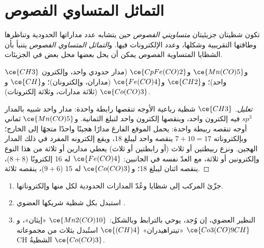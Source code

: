 \section{التماثل المتساوي الفصوص}

\begin{definition}\label{def:b3:organometallic-bonding:isolobal}
تكون شظيتان جزيئيتان \emph{متساويتي الفصوص} حين يتشابه
عدد مداراتها الحدودية وتناظرها وطاقتها التقريبية وشكلها، 
وعدد الإلكترونات فيها. و\emph{التماثل المتساوي
الفصوص} يتنبأ بأن الشظايا المتساوية الفصوص يمكن أن يحل بعضها
محل بعض في الجزيئات.
\end{definition}

\begin{proposition}\label{prop:b3:organometallic-bonding:isolobal}
$\ce{CH3}$ و$\ce{Mn(CO)5}$ و$\ce{CpFe(CO)2}$  (مدار حدودي واحد، وإلكترون واحد)؛
و$\ce{CH2}$ و$\ce{Fe(CO)4}$ (مداران، وإلكترونان)؛ و$\ce{CH}$ و$\ce{Co(CO)3}$ (ثلاثة مدارات،
وثلاثة إلكترونات).
\end{proposition}

\begin{proof}[تعليل]
$\ce{CH3}$ شظية رباعية الأوجه تنقصها رابطة واحدة: مدار واحد شبيه بالمدار $sp^3$ فيه
إلكترون واحد، وينقصها إلكترون واحد لتبلغ الثمانية. و$\ce{Mn(CO)5}$ ثماني أوجه تنقصه ربيطة واحدة:
يحمل الموقع الفارغ مدارًا هجينًا واحدًا متجهًا إلى الخارج؛ وبإلكتروناته $7 + 10 = 17$ ينقصه
واحد ليبلغ 18، ويقع إلكترونه المفرد في ذلك المدار الهجين. ونزع ربيطتين أو ثلاث
(أو رابطتين أو ثلاث) يعطي مدارين أو ثلاثة من هذا النوع وإلكترونين أو ثلاثة، مع
العدّ نفسه في الجانبين: $\ce{Fe(CO)4}$ له 16 إلكترونًا ($8 + 8$)، ينقصه اثنان ليبلغ 18؛
و$\ce{Co(CO)3}$ له 15 ($9 + 6$)، ينقصه ثلاثة.
\end{proof}

\begin{method}\label{met:b3:organometallic-bonding:isolobal}
\begin{enumerate}
  \item جزّئ المركب إلى شظايا وعُدّ المدارات الحدودية لكل منها
        وإلكتروناتها.
  \item استبدل بكل شظية شريكها العضوي .
  \item النظير العضوي، إن وُجد، يوحي بالترابط وبالشكل:
        $\ce{Mn2(CO)10}$ «إيثان»، و$\ce{Co3(CO)9CH}$ «تيتراهيدران» $\ce{(CH)4}$ استُبدل بثلاث من مجموعاته CH
        الشظيةُ $\ce{Co(CO)3}$.
\end{enumerate}
\end{method}

